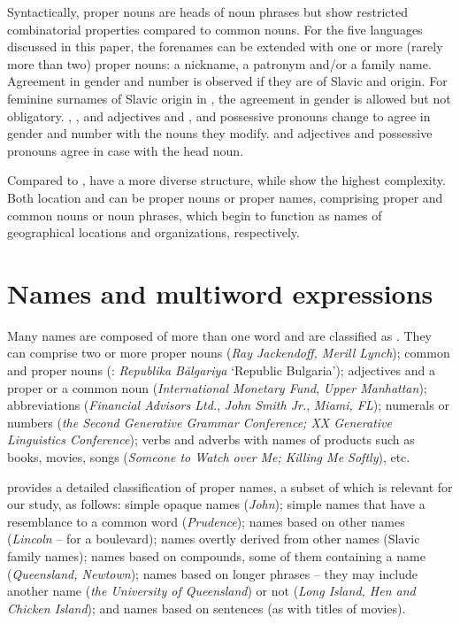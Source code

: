 \documentclass[output=paper]{langsci/langscibook}
\begin{document}
Syntactically, proper nouns are heads of noun phrases but show
restricted combinatorial properties compared to common nouns. For the
five languages discussed in this paper, the forenames can be extended
with one or more (rarely more than two) proper nouns: a nickname, a
patronym and/or a family name. Agreement in gender and number is
observed if they are of Slavic and  origin. For feminine surnames
of Slavic origin in , the agreement in gender is allowed but not
obligatory. , ,  and  adjectives and
,  and  possessive pronouns change to agree in
gender and number with the nouns they modify.  and 
adjectives and possessive pronouns agree in case with the head noun.



Compared to ,  have a more diverse
structure, while  show the highest complexity. Both
location and  can be proper nouns or proper names,
comprising proper and common nouns or noun phrases, which begin to
function as names of geographical locations and organizations,
respectively.

\section{Names and multiword expressions}

Many names are composed of more than one word and are classified as
. They can comprise two or more proper nouns
(\textit{Ray Jackendoff, Merill Lynch}); common and proper nouns (:
\textit{Republika Bălgariya} ‘Republic Bulgaria’); adjectives and a
proper or a common noun (\textit{International Monetary Fund},
\textit{Upper Manhattan}); abbreviations (\textit{Financial Advisors
Ltd.}, \textit{John Smith Jr.}, \textit{Miami, FL}); numerals or
numbers (\textit{the Second Generative Grammar Conference; XX
Generative Linguistics Conference}); verbs and adverbs with names of
products such as books, movies, songs (\textit{Someone to Watch over
Me; Killing Me Softly}), etc.

\cite{anderson2007} provides a detailed classification of proper names, a
subset of which is relevant for our study, as follows: simple opaque
names (\textit{John}); simple names that have a resemblance to a common
word (\textit{Prudence}); names based on other names (\textit{Lincoln}
– for a boulevard); names overtly derived from other names (Slavic
family names); names based on compounds, some of them containing a name
(\textit{Queensland, Newtown}); names based on longer phrases – they
may include another name (\textit{the University of Queensland}) or not
(\textit{Long Island, Hen and Chicken Island}); and names based on
sentences (as with titles of movies).
\end{document}
